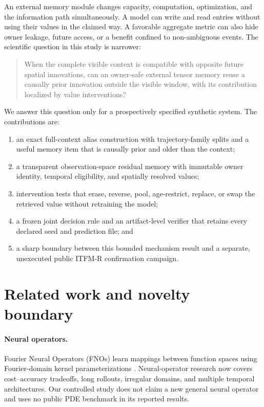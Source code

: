 \documentclass[11pt]{article}
\newcommand{\publicmethod}{ITFM-R}
\begin{document}
An external memory module changes capacity, computation, optimization, and the
information path simultaneously. A model can write and read entries without
using their values in the claimed way. A favorable aggregate metric can also
hide owner leakage, future access, or a benefit confined to non-ambiguous
events. The scientific question in this study is narrower:

\begin{quote}
When the complete visible context is compatible with opposite future spatial
innovations, can an owner-safe external tensor memory reuse a causally prior
innovation outside the visible window, with its contribution localized by
value interventions?
\end{quote}

We answer this question only for a prospectively specified synthetic system.
The contributions are:

\begin{enumerate}[leftmargin=*]
  \item an exact full-context alias construction with trajectory-family splits
  and a useful memory item that is causally prior and older than the context;
  \item a transparent observation-space residual memory with immutable owner
  identity, temporal eligibility, and spatially resolved values;
  \item intervention tests that erase, reverse, pool, age-restrict, replace,
  or swap the retrieved value without retraining the model;
  \item a frozen joint decision rule and an artifact-level verifier that retains
  every declared seed and prediction file; and
  \item a sharp boundary between this bounded mechanism result and a separate,
  unexecuted public \publicmethod{} confirmation campaign.
\end{enumerate}

\section{Related work and novelty boundary}

\paragraph{Neural operators.}
Fourier Neural Operators (FNOs) learn mappings between function spaces using
Fourier-domain kernel parameterizations \cite{li2020fno}. Neural-operator
research now covers cost--accuracy tradeoffs, long rollouts, irregular domains,
and multiple temporal architectures. Our controlled study does not claim a new
general neural operator and uses no public PDE benchmark in its reported
results.
\end{document}
